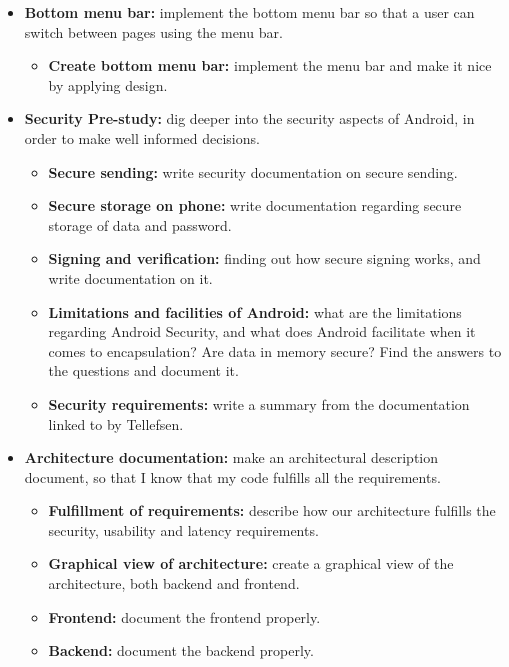 \begin{itemize}
\begin{itemize}
\end{itemize}
\item{}\textbf{Bottom menu bar:} implement the bottom menu bar so that a user can switch between pages using the menu bar.
\begin{itemize}
\item{}\textbf{Create bottom menu bar:} implement the menu bar and make it nice by applying design.
\end{itemize}
\item{}\textbf{Security Pre-study:} dig deeper into the security aspects of Android, in order to make well informed decisions.
\begin{itemize}
\item{}\textbf{Secure sending:} write security documentation on secure sending.
\item{}\textbf{Secure storage on phone:} write documentation regarding secure storage of data and password.
\item{}\textbf{Signing and verification:} finding out how secure signing works, and write documentation on it.
\item{}\textbf{Limitations and facilities of Android:} what are the limitations regarding Android Security, and what does Android facilitate when it comes to encapsulation? Are data in memory secure? Find the answers to the questions and document it.
\item{}\textbf{Security requirements:} write a summary from the documentation linked to by Tellefsen.
\end{itemize}
\item{}\textbf{Architecture documentation:} make an architectural description document, so that I know that my code fulfills all the requirements.
\begin{itemize}
\item{}\textbf{Fulfillment of requirements:} describe how our architecture fulfills the security, usability and latency requirements.
\item{}\textbf{Graphical view of architecture:} create a graphical view of the architecture, both backend and frontend.
\item{}\textbf{Frontend:} document the frontend properly.
\item{}\textbf{Backend:} document the backend properly.
\end{itemize}
\end{itemize}